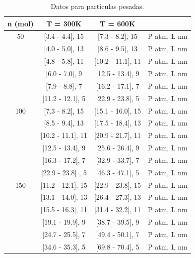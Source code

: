 \documentclass[]{article}
\begin{document}
\begin{table}[H]
 \centering
 \begin{tabular}{|c|c|c|l|} \hline
  n (mol)&  T = 300K        &    T = 600K    &        \\ \hline
   50    & [3.4 - 4.4], 15 & [7.3 - 8.2], 15& P atm, L nm\\ 
         & [4.0 - 5.0], 13 & [8.6 - 9.5], 13& P atm, L nm\\
         & [4.8 - 5.8], 11 & [10.2 - 11.1], 11& P atm, L nm\\ 
         & [6.0 - 7.0],  9 & [12.5 - 13.4],  9& P atm, L nm\\ 
         & [7.9 - 8.8],  7 & [16.2 - 17.1],  7& P atm, L nm\\  
         & [11.2 - 12.1], 5 & [22.9 - 23.8],  5& P atm, L nm\\ \hline
   100   & [7.3 - 8.2], 15 & [15.1 - 16.0], 15& P atm, L nm\\ 
         & [8.5 - 9.4], 13 & [17.5 - 18.4], 13& P atm, L nm\\
         & [10.2 - 11.1], 11 & [20.9 - 21.7], 11& P atm, L nm\\ 
         & [12.5 - 13.4], 9 & [25.6 - 26.4],  9& P atm, L nm\\ 
         & [16.3 - 17.2], 7 & [32.9 - 33.7],  7& P atm, L nm\\  
         & [22.9 - 23.8] , 5 & [46.3 - 47.1],  5& P atm, L nm\\ \hline
   150   & [11.2 - 12.1], 15 & [22.9 - 23.8], 15& P atm, L nm\\ 
         & [13.1 - 14.0], 13 & [26.4 - 27.3], 13& P atm, L nm\\
         & [15.5 - 16.3], 11 & [31.4 - 32.2], 11& P atm, L nm\\ 
         & [19.1 - 19.9],  9 & [38.7 - 39.5],  9& P atm, L nm\\ 
         & [24.7 - 25.5],  7 & [49.4 - 50.1],  7& P atm, L nm\\  
         & [34.6 - 35.3],  5 & [69.8 - 70.4],  5& P atm, L nm\\ \hline

   

\end{tabular}
\caption{\label{tab:Pesadas} Datos para partículas pesadas.}
\end{table}
\end{document}
